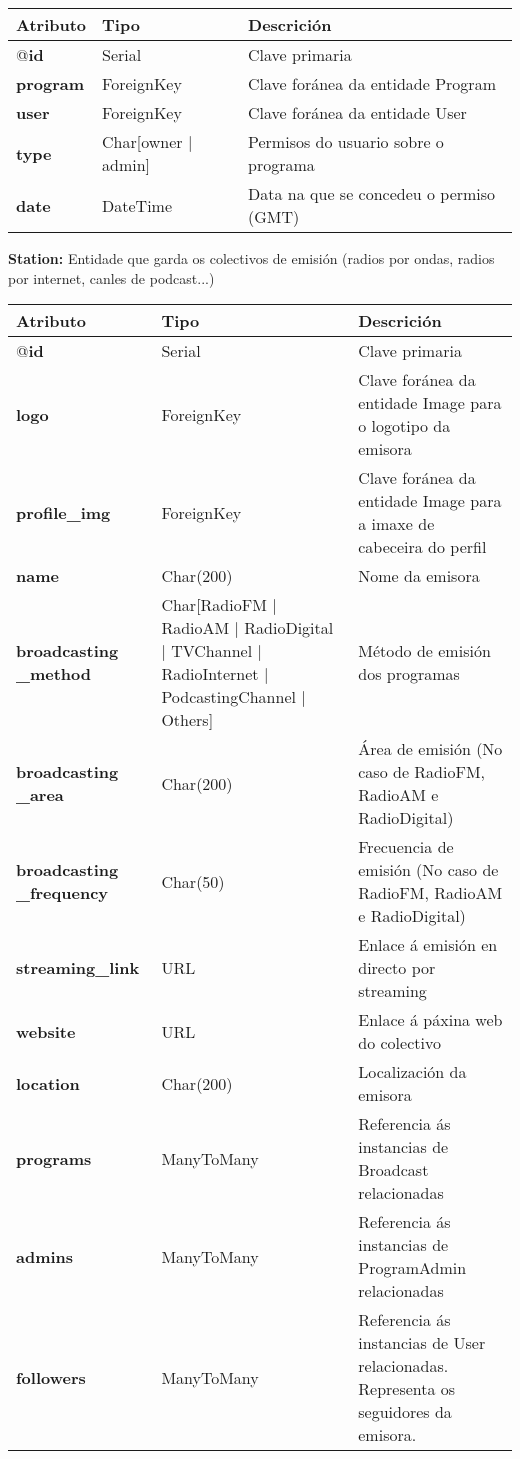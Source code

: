 \begin{longtable}{|p{3cm}|p{3cm}|p{8cm}|}
	\hline
	\rowcolor{gray!50}
	Atributo & Tipo & Descrición\\
	\hline
	@\textbf{id} & Serial & Clave primaria\\
	\hline
	\textbf{program} & ForeignKey & Clave foránea da entidade Program\\
	\hline
	\textbf{user} & ForeignKey & Clave foránea da entidade User\\	
	\hline
	\textbf{type} & Char[owner $|$ admin] & Permisos do usuario sobre o programa\\
	\hline
	\textbf{date} & DateTime & Data na que se concedeu o permiso (GMT)\\
	\hline
\end{longtable}


\textbf{Station:} Entidade que garda os colectivos de emisión (radios por ondas, radios por internet, canles de podcast...)

\begin{longtable}{|p{3cm}|p{3cm}|p{8cm}|}
	\hline
	\rowcolor{gray!50}
	Atributo & Tipo & Descrición\\
	\hline
	@\textbf{id} & Serial & Clave primaria\\
	\hline
	\textbf{logo} & ForeignKey & Clave foránea da entidade Image para o logotipo da emisora\\
	\hline
	\textbf{profile\_img} & ForeignKey & Clave foránea da entidade Image para a imaxe de cabeceira do perfil\\
	\hline
	\textbf{name} & Char(200) & Nome da emisora\\	
	\hline
	\textbf{broadcasting \_method} & Char[RadioFM $|$ RadioAM $|$ RadioDigital $|$ TVChannel $|$ RadioInternet $|$ PodcastingChannel $|$ Others] & Método de emisión dos programas \\
	\hline
	\textbf{broadcasting \_area} & Char(200) & Área de emisión (No caso de RadioFM, RadioAM e RadioDigital)\\
	\hline
	\textbf{broadcasting \_frequency} & Char(50) & Frecuencia de emisión (No caso de RadioFM, RadioAM e RadioDigital)\\
	\hline
	\textbf{streaming\_link} & URL & Enlace á emisión en directo por streaming\\
	\hline
	\textbf{website} & URL & Enlace á páxina web do colectivo\\
	\hline
	\textbf{location} & Char(200) & Localización da emisora\\
	\hline
	\textbf{programs} &  ManyToMany & Referencia ás instancias de Broadcast relacionadas\\
	\hline
	\textbf{admins} &  ManyToMany & Referencia ás instancias de ProgramAdmin relacionadas\\
	\hline
	\textbf{followers} &  ManyToMany & Referencia ás instancias de User relacionadas. Representa os seguidores da emisora.\\
	\hline
\end{longtable}

